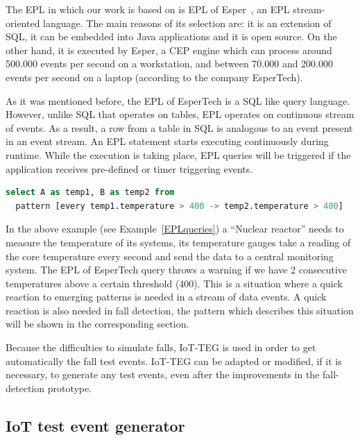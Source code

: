 \documentclass[review]{elsarticle}
\begin{document}
The EPL in which our work is based on is EPL of Esper~\cite{Esper:2016}, an EPL stream-oriented language. The main reasons of its selection are: 
it is an extension of SQL, it can be embedded into Java applications and it is open source. On the other hand, it is executed by Esper, a
CEP engine which can process around 500.000 events per second on a workstation, and between 70.000 and 200.000 events per second on a laptop (according to 
the company EsperTech).
 
As it was mentioned before, the EPL of EsperTech is a SQL like query language. However, unlike SQL that operates on tables, EPL operates on continuous stream of events. As a 
result, a row from a table in SQL is analogous to an event present in an event stream. An EPL statement starts executing continuously during 
runtime. While the execution is taking place, EPL queries will be triggered if the application receives pre-defined or timer triggering events.
 
 \renewcommand{\lstlistingname}{Example}
 
 \begin{lstlisting}[basicstyle=\ttfamily\footnotesize,language=SQL,caption=EPL of EsperTech query example,label=EPLqueries]
select A as temp1, B as temp2 from 
  pattern [every temp1.temperature > 400 -> temp2.temperature > 400]
 \end{lstlisting}
 
In the above example (see Example~\ref{EPLqueries}) a ``Nuclear reactor'' needs to measure the temperature
of its systems, its temperature gauges take a reading of the core temperature every second and send the data 
to a central monitoring system. The EPL of EsperTech query throws a warning if we have 2 consecutive 
temperatures above a certain threshold (400). This is a situation where a quick reaction to emerging patterns 
is needed in a stream of data events. A quick reaction is also needed in fall detection, the pattern which 
describes this situation will be shown in the corresponding section.
 
Because the difficulties to simulate falls, IoT-TEG is used in order to get automatically the fall test events. 
IoT-TEG can be adapted or modified, if it is necessary, to generate any test events, even after the improvements 
in the fall-detection prototype.

\subsection{IoT test event generator}
\label{iotteg}
\end{document}
